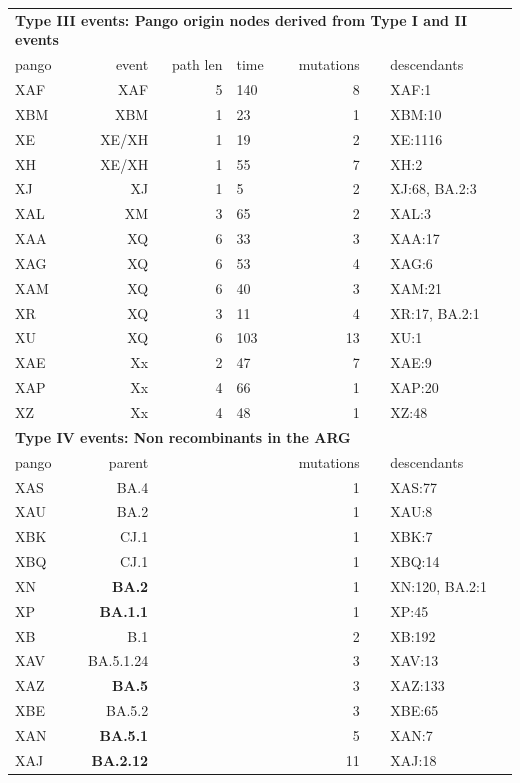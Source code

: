 \documentclass[12pt]{article}
\begin{document}
\begin{table}
\begin{scriptsize}
\begin{tabular}{lrrlrll}
\midrule
\multicolumn{7}{l}{\textbf{Type III events: Pango origin nodes derived from
Type I and II events}}\\
pango & event & path len & time & mutations & & descendants\\
\midrule

XAF & XAF & 5 & 140 & 8   && {XAF:1} \\
XBM & XBM & 1 & 23 & 1    && {XBM:10} \\
XE  & XE/XH & 1 & 19 & 2  && {XE:1116} \\
XH  & XE/XH & 1 & 55 & 7  && {XH:2} \\
XJ  & XJ & 1 & 5 & 2      && {XJ:68, BA.2:3} \\
XAL & XM & 3 & 65 & 2     && {XAL:3} \\
XAA & XQ & 6 & 33 & 3     && {XAA:17} \\
XAG & XQ & 6 & 53 & 4     && {XAG:6} \\
XAM & XQ & 6 & 40 & 3     && {XAM:21} \\
XR  & XQ & 3 & 11 & 4     && {XR:17, BA.2:1} \\
XU  & XQ & 6 & 103 & 13   && {XU:1} \\
XAE & Xx & 2 & 47 & 7     && {XAE:9} \\
XAP & Xx & 4 & 66 & 1     && {XAP:20} \\
XZ  & Xx & 4 & 48 & 1     && {XZ:48} \\

\midrule
\multicolumn{7}{l}{\textbf{Type IV events: Non recombinants in the ARG}}\\
pango & parent &&& mutations && descendants \\
\midrule

XAS &  BA.4            &&& 1 && {XAS:77} \\
XAU &  BA.2            &&& 1 && {XAU:8} \\
XBK &  CJ.1            &&& 1 && {XBK:7} \\
XBQ &  CJ.1            &&& 1 && {XBQ:14} \\
XN  &  \textbf{BA.2}   &&& 1 && {XN:120, BA.2:1} \\
XP  &  \textbf{BA.1.1} &&& 1 && {XP:45} \\
XB  &  B.1             &&& 2 && {XB:192} \\
XAV &  BA.5.1.24       &&& 3 && {XAV:13} \\
XAZ &  \textbf{BA.5}   &&& 3 && {XAZ:133} \\
XBE &  BA.5.2          &&& 3 && {XBE:65} \\
XAN &  \textbf{BA.5.1} &&& 5 && {XAN:7} \\
XAJ &  \textbf{BA.2.12}&&& 11&& {XAJ:18} \\
\bottomrule
\end{tabular}
\end{scriptsize}
\end{table}
\restoregeometry %
\end{document}
